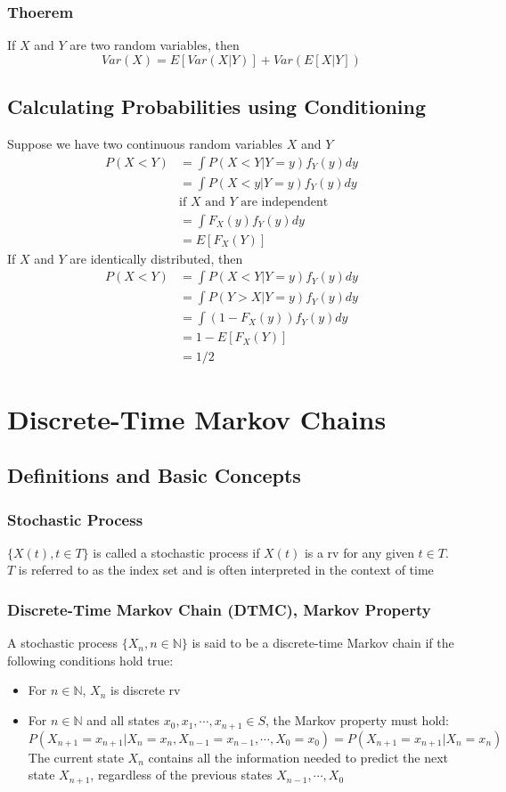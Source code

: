 \documentclass[11pt]{article}
\newcommand{\N}{{\mathbb{N}}}
\begin{document}
\subsubsection*{Thoerem}
If $X$ and $Y$ are two random variables, then 
\[Var(X)=E[Var(X|Y)]+Var(E[X|Y])\]
\subsection{Calculating Probabilities using Conditioning}
Suppose we have two continuous random variables $X$ and $Y$
\begin{align*}
    P(X<Y) &= \int P(X<Y|Y=y)f_Y(y)dy \\
           &= \int P(X<y|Y=y)f_Y(y)dy \\
           &\text{if $X$ and $Y$ are independent} \\
           &= \int F_X(y)f_Y(y)dy \\
           &= E[F_X(Y)]
\end{align*}
If $X$ and $Y$ are identically distributed, then
\begin{align*}
    P(X<Y) &= \int P(X<Y|Y=y)f_Y(y)dy \\
           &= \int P(Y>X|Y=y)f_Y(y)dy \\
           &= \int (1-F_X(y))f_Y(y)dy \\
           &= 1-E[F_X(Y)] \\
           &= 1/2
\end{align*}

\newpage 
\section{Discrete-Time Markov Chains}
\subsection{Definitions and Basic Concepts}
\subsubsection{Stochastic Process}
$\{X(t),t\in T\}$ is called a stochastic process if $X(t)$ is a rv for any given $t\in T$. $T$ is referred to as the index set and is often interpreted in the context of time 
\subsubsection{Discrete-Time Markov Chain (DTMC), Markov Property}
A stochastic process $\{X_n,n\in\N\}$ is said to be a discrete-time Markov chain if the following conditions hold true:
\begin{itemize}
    \item For $n\in\N$, $X_n$ is discrete rv 
    \item For $n\in\N$ and all states $x_0,x_1,\cdots,x_{n+1}\in S$, the Markov property must hold:
    \[P(X_{n+1}=x_{n+1}|X_n=x_n,X_{n-1}=x_{n-1},\cdots,X_0=x_0)=P(X_{n+1}=x_{n+1}|X_n=x_n)\]
    The current state $X_n$ contains all the information needed to predict the next state $X_{n+1}$, regardless of the previous states $X_{n-1},\cdots,X_0$
\end{itemize}
\end{document}
